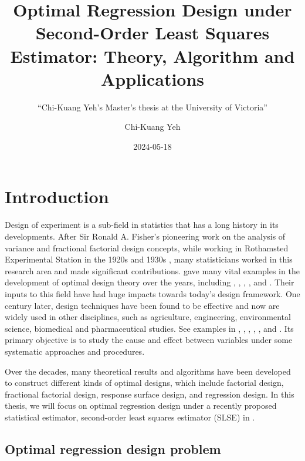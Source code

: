 \documentclass[
]{book}
\title{Optimal Regression Design under Second-Order Least Squares Estimator: Theory, Algorithm and Applications}
\subtitle{``Chi-Kuang Yeh's Master's thesis at the University of Victoria''}
\author{Chi-Kuang Yeh}
\date{2024-05-18}
\theoremstyle{definition}
\theoremstyle{definition}
\theoremstyle{definition}
\theoremstyle{definition}
\theoremstyle{remark}
\begin{document}
\maketitle

{
\setcounter{tocdepth}{1}
\tableofcontents
}
\chapter{Introduction}\label{intro}

Design of experiment is a sub-field in statistics that has a long history in its developments. After Sir Ronald A. Fisher's pioneering work on the analysis of variance and fractional factorial design concepts, while working in Rothamsted Experimental Station in the 1920s and 1930s \citep[p.~21]{montgomery2012introduction}, many statisticians worked in this research area and made significant contributions. \citet{berger2009introduction} gave many vital examples in the development of optimal design theory over the years, including \citet{chernoff1953locally}, \citet{kiefer1959optimum}, \citet{kiefer1974general}, \citet{kiefer-wolfowitz1959optimum}, \citet{silvey1980optimal} and \citet{atkinson1992optimum}. Their inputs to this field have had huge impacts towards today's design framework. One century later, design techniques have been found to be effective and now are widely used in other disciplines, such as agriculture, engineering, environmental science, biomedical and pharmaceutical studies. See examples in \citet{crary2000optimal}, \citet{crary2002design}, \citet{haines2003bayesian}, \citet{zhou2003a}, \citet{jain2003modeling}, \citet{brosi2008optimal} and \citet{schorning2017optimal}. Its primary objective is to study the cause and effect between variables under some systematic approaches and procedures.

Over the decades, many theoretical results and algorithms have been developed to construct different kinds of optimal designs, which include factorial design, fractional factorial design, response surface design, and regression design. In this thesis, we will focus on optimal regression design under a recently proposed statistical estimator, second-order least squares estimator (SLSE) in \citet{wang2008second}.

\section{Optimal regression design problem}\label{optimal-regression-design-problem}
\end{document}
